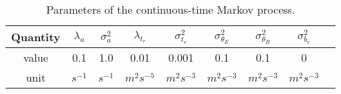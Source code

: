 \begin{table}[h!]
	\centering
	\begin{tabular}[h]{|c|c|c|c|c|c|c|c|c|}
		\hline
		Quantity & 	$\lambda_a$ & $\sigma_a^2$ & $\lambda_{t_r}$ & $\sigma_{t_r}^2$ & $\sigma_{\theta_E}^2$ & $\sigma_{\theta_B}^2$ & $\sigma_{b_r}^2$ \T \\ \hline
		value	 &  0.1 & 1.0 & 0.01 & 0.001 & 0.1 & 0.1 & 0 \T \\ \hline
		unit	 &  $s^{-1}$ & $s^{-1}$ &  $m^2s^{-5}$ & $m^2s^{-3}$ & $m^2s^{-3}$ & $m^2s^{-3}$ & $m^2s^{-3}$ \T \\ \hline				
	\end{tabular}
	\caption{Parameters of the continuous-time Markov process.}
	\label{table:error_std_prediction}
\end{table}